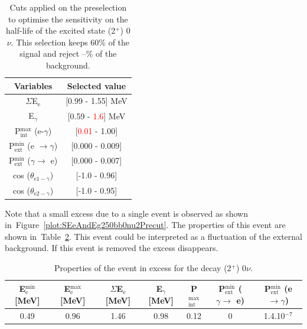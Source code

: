 \documentclass[main.tex]{subfiles}
\begin{document}
\FloatBarrier


\begin{table}[h!]
\centering
\begin{tabular}{c|c}
Variables & Selected value \\
\toprule
$\Sigma$E$_{\text{e}}$ & [0.99 - 1.55] MeV \\
E$_{\gamma}$    & [0.59 - \textcolor{red}{1.6}] MeV \\
P$_{\text{int}}^{\text{max}}$ (e-$\gamma$) & [\textcolor{red}{0.01} - 1.00] \\
P$_{\text{ext}}^{\text{min}}$ (e $\rightarrow \gamma$) & [0.000 - 0.009] \\
P$_{\text{ext}}^{\text{min}}$ ($\gamma \rightarrow$ e) & [0.000 - 0.007] \\
cos ($\theta_{\text{e1}-\gamma}$) & [-1.0 - 0.96] \\
cos ($\theta_{\text{e2}-\gamma}$) & [-1.0 - 0.95] \\
\bottomrule
\end{tabular}
\caption{Cuts applied on the preselection to optimise the sensitivity on the half-life of the excited state (2$^+$) 0$\nu$. This selection keeps 60\% of the signal and reject --\% of the background.}
\label{tab:Cuts0nu2Plus250keV}
\end{table}





\NI  Note that a small excess due to a single event is observed as shown in~Figure~\ref{plot:SEeAndEg250bb0nu2Precut}. The properties of this event are shown in~Table~\ref{tab:EventExcessbb0nu2}. This event could be interpreted as a fluctuation of the external background. If this event is removed the excess disappears.


\begin{table}[h!]
\centering
\begin{tabular}{ccccccc}
\hline
E$^{\text{min}}_\text{e}$ [MeV] & E$^{\text{max}}_\text{e}$ [MeV]& $\Sigma$E$_\text{e}$ [MeV]& E$_{\gamma}$ [MeV]& P$_{\text{int}}^{\text{max}}$ & P$_{\text{ext}}^{\text{min}}$ ($\gamma \rightarrow$ e) & P$_{\text{ext}}^{\text{min}}$ (e $ \rightarrow \gamma$) \\
\hline
0.49 & 0.96 & 1.46 & 0.98 & 0.12 & 0 & 1.4.10$^{-\text{7}}$  \\
\hline
\end{tabular}
\caption{Properties of the event in excess for the decay (2$^+$) 0$\nu$.}
\label{tab:EventExcessbb0nu2}
\end{table}
\end{document}
